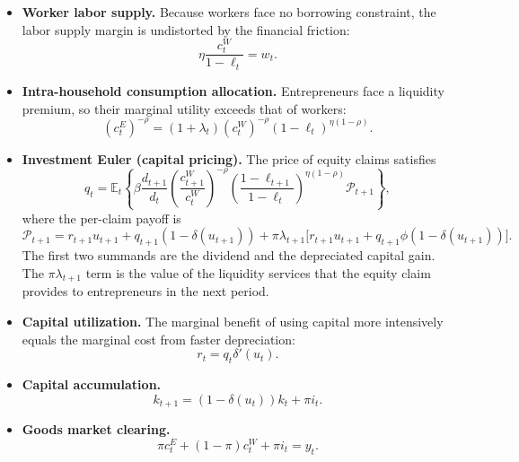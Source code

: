 \documentclass[11pt]{article}
\newcommand{\E}{\mathbb{E}}
\newcommand{\mc}[1]{\mathcal{#1}}
\newcommand{\cE}{c^E_t}
\newcommand{\cW}{c^W_t}
\newcommand{\cWp}{c^W_{t+1}}
\theoremstyle{plain}
\theoremstyle{definition}
\begin{document}
\begin{itemize}
\item \textbf{Worker labor supply.} Because workers face no borrowing
constraint, the labor supply margin is undistorted by the financial friction:
\begin{equation}
\eta \frac{\cW}{1-\ell_t} = w_t.
\tag{LS-FVGQ}
\end{equation}

\item \textbf{Intra-household consumption allocation.} Entrepreneurs face a
liquidity premium, so their marginal utility exceeds that of workers:
\begin{equation}
(\cE)^{-\rho} = (1+\lambda_t) (\cW)^{-\rho} (1-\ell_t)^{\eta(1-\rho)}.
\tag{IH-FVGQ}
\end{equation}

\item \textbf{Investment Euler (capital pricing).} The price of equity claims
satisfies
\begin{equation}
q_t = \E_t \!\left\{
\beta \frac{d_{t+1}}{d_t}
\left(\frac{\cWp}{\cW}\right)^{-\rho}
\left(\frac{1-\ell_{t+1}}{1-\ell_t}\right)^{\eta(1-\rho)}
\mc{P}_{t+1}
\right\},
\tag{IE-FVGQ}
\end{equation}
where the per-claim payoff is
\begin{equation}
\mc{P}_{t+1} = r_{t+1} u_{t+1} + q_{t+1} (1-\delta(u_{t+1}))
+ \pi \lambda_{t+1} \big[r_{t+1} u_{t+1} + q_{t+1} \phi (1-\delta(u_{t+1}))\big].
\tag{Pay-FVGQ}
\end{equation}
The first two summands are the dividend and the depreciated capital gain. The
$\pi \lambda_{t+1}$ term is the value of the liquidity services that the
equity claim provides to entrepreneurs in the next period.

\item \textbf{Capital utilization.} The marginal benefit of using capital
more intensively equals the marginal cost from faster depreciation:
\begin{equation}
r_t = q_t \delta'(u_t).
\tag{Util-FVGQ}
\end{equation}

\item \textbf{Capital accumulation.}
\begin{equation}
k_{t+1} = (1-\delta(u_t)) k_t + \pi i_t.
\tag{Cap-FVGQ}
\end{equation}

\item \textbf{Goods market clearing.}
\begin{equation}
\pi \cE + (1-\pi) \cW + \pi i_t = y_t.
\tag{GM-FVGQ}
\end{equation}
\end{itemize}
\end{document}
